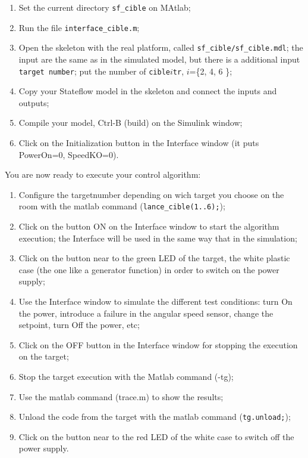 \documentclass[a4paper]{article}
\begin{document}
\begin{enumerate}
\item Set the current directory {\tt sf\_cible} on MAtlab;
\item Run the file {\tt interface\_cible.m};
\item Open the skeleton with the real platform, called {\tt sf\_cible/sf\_cible.mdl};
	the input are the same as in the simulated model, but there is a additional input
	{\tt target number}; put the number of {\tt cible}$i${\tt tr}, $i$=\{2, 4, 6 \};
\item Copy your Stateflow model in the skeleton and connect the inputs and outputs;
\item Compile your model, Ctrl-B (build) on the Simulink window;
\item Click on the Initialization button in the Interface window (it puts PowerOn=0, SpeedKO=0).
\end{enumerate}

You are now ready to execute your control algorithm:
\begin{enumerate}
\item Configure the targetnumber depending on wich target you choose on the room with the 
	matlab command ({\tt lance\_cible(1..6);});
\item Click on the button ON on the Interface window to start the algorithm execution;
	the Interface will be used in the same way that in the simulation;
\item Click on the button near to the green LED of the target, the white plastic case 
	(the one like a generator function) in order to switch on the power supply;
\item  Use the Interface window to simulate the different test conditions:
	turn On the power, introduce a failure in the angular speed sensor, change the setpoint, 
	turn Off the power, etc;
\item Click on the OFF button in the Interface window for stopping the execution on the target;
\item Stop the target execution with the Matlab command (-tg);
\item Use the matlab command (trace.m) to show the results;
\item Unload the code from the target with the matlab command ({\tt tg.unload;});
\item Click on the button near to the red LED of the white case  to switch off the power supply.
\end{enumerate}
\end{document}
